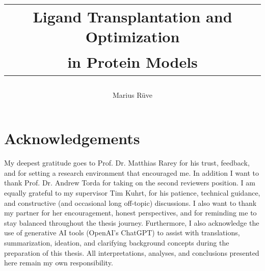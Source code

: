 \documentclass[twoside,a4paper]{master}
\begin{document}

\author{Marius R\"uve}
\title{
  \begin{tabular}{c}
    \textbf{Ligand Transplantation and Optimization} \\[3mm]
    \textbf{in Protein Models}
  \end{tabular}}
\Maketitle



\setcounter{tocdepth}{1}
\tableofcontents
\clearpage
\listoffigures
\clearpage
\listoftables
\clearpage
\printnoidxglossary[type=\acronymtype]
\clearpage







\newpage
\small
\printbibliography[title=References]
\normalsize


\appendix
\noappendicestocpagenum
\addappheadtotoc




\chapter{Acknowledgements}
My deepest gratitude goes to Prof. Dr. Matthias Rarey for his trust, feedback, and for setting a research environment that encouraged me. In addition I want to thank Prof. Dr. Andrew Torda for taking on the second reviewers position.
I am equally grateful to my supervisor Tim Kuhrt, for his patience, technical guidance, and constructive (and occasional long off-topic) discussions.
I also want to thank my partner for her encouragement, honest perspectives, and for reminding me to stay balanced throughout the thesis journey.
Furthermore, I also acknowledge the use of generative AI tools (OpenAI's ChatGPT) to assist with translations, summarization, ideation, and clarifying background concepts during the preparation of this thesis. All interpretations, analyses, and conclusions presented here remain my own responsibility.

\Assertion
\end{document}
